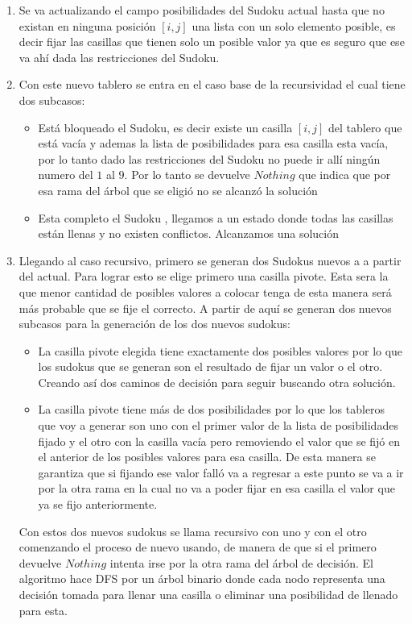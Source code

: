 \documentclass[a4paper,10pt,twocolumn]{article}
\begin{document}
\begin{enumerate}
	\item Se va actualizando el campo posibilidades del Sudoku actual hasta que no existan en ninguna posición $[i,j]$ una lista con un solo elemento posible, es decir fijar las casillas que tienen solo un posible valor ya que es seguro que ese va ahí dada las restricciones del Sudoku.
	
	\item Con este nuevo tablero se entra en el caso base de la recursividad el cual tiene dos subcasos:
	\begin{itemize}
		\item  Está bloqueado el Sudoku, es decir  existe un casilla $[i,j]$ del tablero que está vacía y ademas la lista de posibilidades para esa casilla esta vacía, por lo tanto dado las restricciones del Sudoku no puede ir allí ningún numero del $1$ al $9$. Por lo tanto se devuelve $Nothing$ que indica que por esa rama del árbol que se eligió no se alcanzó la solución 
		
		\item Esta completo el Sudoku , llegamos a un estado donde todas las casillas están llenas y no existen conflictos. Alcanzamos una solución 
		
	\end{itemize}
	
	\item Llegando al caso recursivo, primero se generan dos Sudokus nuevos a a partir del actual. Para lograr esto se elige primero una casilla pivote. Esta sera la que menor cantidad de posibles valores a colocar tenga de esta manera será más probable que se fije el correcto. A partir de aquí se generan dos nuevos subcasos para la generación de los dos nuevos sudokus: 
	\begin{itemize}
		\item La casilla pivote elegida tiene exactamente dos posibles valores por lo que los sudokus que se generan son el resultado de fijar un valor o el otro. Creando así dos caminos de decisión para seguir buscando otra solución.
		
		\item La casilla pivote tiene más de dos posibilidades por lo que los tableros que voy a generar son uno con el primer valor de la lista de posibilidades fijado y el otro con la casilla vacía pero removiendo el valor que se fijó en el anterior de los posibles valores para esa casilla. De esta manera se garantiza que si fijando ese valor falló va a regresar a este punto se va a ir por la otra rama en la cual no va a poder fijar en esa casilla el valor que ya se fijo anteriormente.
	\end{itemize} 
	 
	Con estos dos nuevos sudokus se llama recursivo con uno y con el otro comenzando el proceso de nuevo usando, de manera de que si el primero devuelve $Nothing$ intenta irse por la otra rama del árbol de decisión. El algoritmo hace DFS por un árbol binario donde cada nodo representa una decisión tomada para llenar una casilla o eliminar una posibilidad de llenado para esta.   
		 
\end{enumerate}
\end{document}

